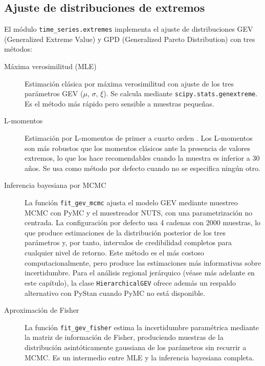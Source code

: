 \subsection{Ajuste de distribuciones de extremos}

El módulo \texttt{time\_series.extremes} implementa el ajuste de distribuciones GEV (Generalized Extreme Value) y GPD (Generalized Pareto Distribution) \parencite{coles2001extremes} con tres métodos:

\begin{description}
  \item[Máxima verosimilitud (MLE)] Estimación clásica por máxima verosimilitud con ajuste de los tres parámetros GEV ($\mu$, $\sigma$, $\xi$). Se calcula mediante \texttt{scipy.stats.genextreme}. Es el método más rápido pero sensible a muestras pequeñas.

  \item[L-momentos] Estimación por L-momentos de primer a cuarto orden \parencite{hosking1997rfa}. Los L-momentos son más robustos que los momentos clásicos ante la presencia de valores extremos, lo que los hace recomendables cuando la muestra es inferior a 30 años. Se usa como método por defecto cuando no se especifica ningún otro.

  \item[Inferencia bayesiana por MCMC] La función \texttt{fit\_gev\_mcmc} ajusta el modelo GEV mediante muestreo MCMC con PyMC \parencite{salvatier2016pymc} y el muestreador NUTS, con una parametrización no centrada. La configuración por defecto usa 4 cadenas con 2000 muestras, lo que produce estimaciones de la distribución posterior de los tres parámetros y, por tanto, intervalos de credibilidad completos para cualquier nivel de retorno. Este método es el más costoso computacionalmente, pero produce las estimaciones más informativas sobre incertidumbre. Para el análisis regional jerárquico (véase más adelante en este capítulo), la clase \texttt{HierarchicalGEV} ofrece además un respaldo alternativo con PyStan \parencite{carpenter2017stan} cuando PyMC no está disponible.

  \item[Aproximación de Fisher] La función \texttt{fit\_gev\_fisher} estima la incertidumbre paramétrica mediante la matriz de información de Fisher, produciendo muestras de la distribución asintóticamente gaussiana de los parámetros sin recurrir a MCMC. Es un intermedio entre MLE y la inferencia bayesiana completa.
\end{description}

